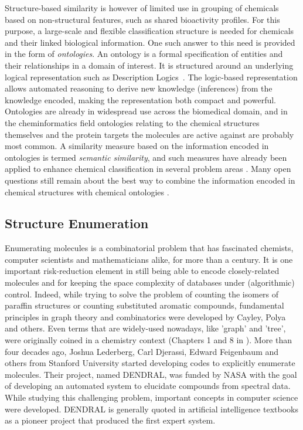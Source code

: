 \documentclass{sig-alternate}
\begin{document}
Structure-based similarity is however of
limited use in grouping of chemicals based on non-structural features, such as
shared bioactivity profiles. For this purpose, a large-scale and flexible
classification structure is needed for chemicals and their linked biological
information. One such answer to this need is provided in the form of \emph{ontologies}.
An ontology is a formal specification of entities and their relationships in a
domain of interest. It is structured around an underlying logical representation
such as Description Logics~\cite{baaderdl2007}. The logic-based representation allows
automated reasoning to derive new knowledge (inferences) from the knowledge
encoded, making the representation both compact and powerful.
Ontologies are already in widespread use across the biomedical domain, and in the cheminformatics field ontologies relating to the chemical structures themselves and the protein targets the molecules are active against are probably most common. A
similarity measure based on the information encoded in ontologies is termed
\emph{semantic similarity}, and such measures have already been applied to enhance
chemical classification in several problem areas \cite{couto2010}. Many open
questions still remain about the best way to combine the information encoded in
chemical structures with chemical ontologies \cite{hastingsowled2010}.

\subsection{Structure Enumeration}
\label{sec:struct-enum}

Enumerating molecules is a combinatorial problem that has fascinated
chemists, computer scientists and mathematicians alike, for more than a
century. It is one important risk-reduction element in still being
able to encode closely-related molecules and for keeping the space
complexity of databases under (algorithmic) control. Indeed, while
trying to solve the problem of counting the isomers of paraffin
structures or counting substituted aromatic compounds, fundamental
principles in graph theory and combinatorics were developed by Cayley,
Polya and others. Even terms that are widely-used nowadays, like 'graph'
and 'tree', were originally coined in a chemistry context (Chapters 1 and
8 in \cite{faulon2010}). More than four decades ago, Joshua Lederberg,
Carl Djerassi, Edward Feigenbaum and others from Stanford University
started developing codes to explicitly enumerate molecules. Their
project, named DENDRAL, was funded by NASA with the goal of developing
an automated system to elucidate compounds from spectral data. While
studying this challenging problem, important concepts in computer
science were developed. DENDRAL is generally quoted in artificial
intelligence textbooks as a pioneer project that produced the first
expert system.
\end{document}
